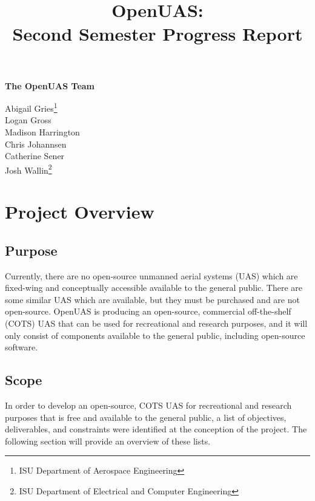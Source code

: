 ﻿\documentclass{article}
\title{OpenUAS:\\Second Semester Progress Report }
\author{ }
\begin{document}
\maketitle

\newpage

\begin{center}
\Large \textbf{The OpenUAS Team}

\vspace{1cm}

\large{
Abigail Gries\footnote[1]{ISU Department of Aerospace Engineering}\\ Logan Gross\footnotemark[1]\\Madison Harrington\footnotemark[1]\\ Chris Johannsen\footnotemark[1]\\ Catherine Sener\footnotemark[1]\\ Josh Wallin\footnote[2]{ISU Department of Electrical and Computer Engineering}
}\par

\end{center}

\newpage


\tableofcontents

\section{Project Overview}

\subsection{Purpose}
Currently, there are no open-source unmanned aerial systems (UAS) which are fixed-wing and conceptually accessible available to the general public. There are some similar UAS which are available, but they must be purchased and are not open-source. OpenUAS is producing an open-source, commercial off-the-shelf (COTS) UAS that can be used for recreational and research purposes, and it will only consist of components available to the general public, including open-source software.

\subsection{Scope}
In order to develop an open-source, COTS UAS for recreational and research purposes that is free and available to the general public, a list of objectives, deliverables, and constraints were identified at the conception of the project. The following section will provide an overview of these lists.
\end{document}
